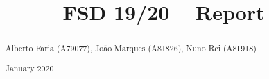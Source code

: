 \documentclass[acmsmall,nonacm,screen]{acmart}
\begin{document}
\title{FSD 19/20 -- Report}
\makeatletter \renewcommand{\shortauthors}{\@title} \makeatother

\begin{abstract}
\large
\vspace*{-.8\baselineskip}
Alberto Faria (A79077), João Marques (A81826), Nuno Rei (A81918)
\vspace*{.4\baselineskip}
\par {} January 2020
\vspace*{.25\baselineskip}
\end{abstract}

\maketitle






\end{document}
